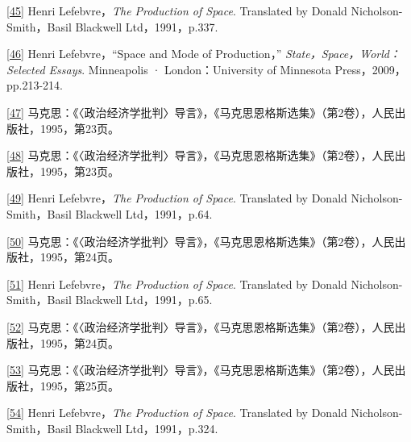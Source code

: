 \documentclass[UTF8, fontset = sourcesans, a4paper, oneside, zihao =
-4, scheme=chinese, no-math, space=true]{ctexbook}
\begin{document}
\protect\hypertarget{part0010_split_002.htmlux5cux23m45}{}{}\protect\hyperlink{part0010_split_002.htmlux5cux23w45}{{[}45{]}}
Henri Lefebvre，\emph{The Production of Space}. Translated by Donald
Nicholson-Smith，Basil Blackwell Ltd，1991，p.337.

\protect\hypertarget{part0010_split_002.htmlux5cux23m46}{}{}\protect\hyperlink{part0010_split_002.htmlux5cux23w46}{{[}46{]}}
Henri Lefebvre，``Space and Mode of Production，''
\emph{State，Space，World：Selected Essays}. Minneapolis ·
London：University of Minnesota Press，2009，pp.213-214.

\protect\hypertarget{part0010_split_002.htmlux5cux23m47}{}{}\protect\hyperlink{part0010_split_002.htmlux5cux23w47}{{[}47{]}}
马克思：《〈政治经济学批判〉导言》，《马克思恩格斯选集》（第2卷），人民出版社，1995，第23页。

\protect\hypertarget{part0010_split_002.htmlux5cux23m48}{}{}\protect\hyperlink{part0010_split_002.htmlux5cux23w48}{{[}48{]}}
马克思：《〈政治经济学批判〉导言》，《马克思恩格斯选集》（第2卷），人民出版社，1995，第23页。

\protect\hypertarget{part0010_split_002.htmlux5cux23m49}{}{}\protect\hyperlink{part0010_split_002.htmlux5cux23w49}{{[}49{]}}
Henri Lefebvre，\emph{The Production of Space}. Translated by Donald
Nicholson-Smith，Basil Blackwell Ltd，1991，p.64.

\protect\hypertarget{part0010_split_002.htmlux5cux23m50}{}{}\protect\hyperlink{part0010_split_002.htmlux5cux23w50}{{[}50{]}}
马克思：《〈政治经济学批判〉导言》，《马克思恩格斯选集》（第2卷），人民出版社，1995，第24页。

\protect\hypertarget{part0010_split_002.htmlux5cux23m51}{}{}\protect\hyperlink{part0010_split_002.htmlux5cux23w51}{{[}51{]}}
Henri Lefebvre，\emph{The Production of Space}. Translated by Donald
Nicholson-Smith，Basil Blackwell Ltd，1991，p.65.

\protect\hypertarget{part0010_split_002.htmlux5cux23m52}{}{}\protect\hyperlink{part0010_split_002.htmlux5cux23w52}{{[}52{]}}
马克思：《〈政治经济学批判〉导言》，《马克思恩格斯选集》（第2卷），人民出版社，1995，第24页。

\protect\hypertarget{part0010_split_002.htmlux5cux23m53}{}{}\protect\hyperlink{part0010_split_002.htmlux5cux23w53}{{[}53{]}}
马克思：《〈政治经济学批判〉导言》，《马克思恩格斯选集》（第2卷），人民出版社，1995，第25页。

\protect\hypertarget{part0010_split_002.htmlux5cux23m54}{}{}\protect\hyperlink{part0010_split_002.htmlux5cux23w54}{{[}54{]}}
Henri Lefebvre，\emph{The Production of Space}. Translated by Donald
Nicholson-Smith，Basil Blackwell Ltd，1991，p.324.
\end{document}

